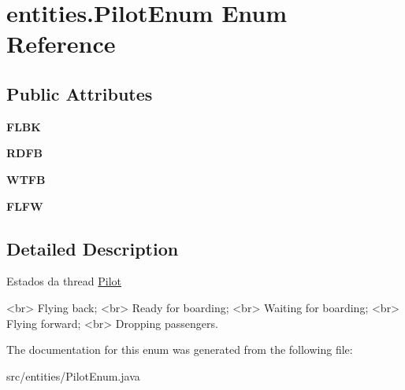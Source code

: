 \hypertarget{enumentities_1_1_pilot_enum}{}\section{entities.\+Pilot\+Enum Enum Reference}
\label{enumentities_1_1_pilot_enum}
\subsection*{Public Attributes}
\begin{DoxyCompactItemize}
\item 
\mbox{\label{enumentities_1_1_pilot_enum_a59f65af4ac9709dae169a0c1b47a582e}} 
{\bfseries F\+L\+BK}
\item 
\mbox{\label{enumentities_1_1_pilot_enum_a12f5fbcba0f68abb8ec830433596255d}} 
{\bfseries R\+D\+FB}
\item 
\mbox{\label{enumentities_1_1_pilot_enum_aa183b583e5e17f6f8244fb0b2f268421}} 
{\bfseries W\+T\+FB}
\item 
\mbox{\label{enumentities_1_1_pilot_enum_aa7131eee86c41d0804e3908fafef11ca}} 
{\bfseries F\+L\+FW}
\end{DoxyCompactItemize}


\subsection{Detailed Description}
Estados da thread \hyperlink{classentities_1_1_pilot}{Pilot} \begin{DoxyVerb}<br> Flying back;
<br> Ready for boarding;
<br> Waiting for boarding;
<br> Flying forward;
<br> Dropping passengers.\end{DoxyVerb}
 

The documentation for this enum was generated from the following file\+:\begin{DoxyCompactItemize}
\item 
src/entities/Pilot\+Enum.\+java\end{DoxyCompactItemize}
